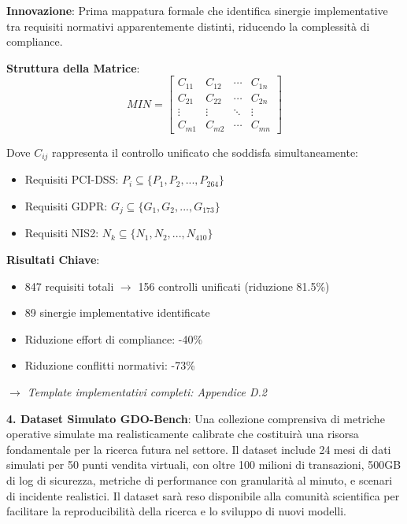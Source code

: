 \begin{tcolorbox}[
    colback=orange!5!white,
    colframe=orange!75!black,
    title={\textbf{Innovation Box 1.3:} Matrice di Integrazione Normativa (MIN)},
    fonttitle=\bfseries,
    boxrule=1.5pt,
    arc=2mm,
    breakable
]
\textbf{Innovazione}: Prima mappatura formale che identifica sinergie implementative tra requisiti normativi apparentemente distinti, riducendo la complessità di compliance.

\vspace{0.3cm}
\textbf{Struttura della Matrice}:
\begin{equation*}
MIN = \begin{bmatrix}
C_{11} & C_{12} & \cdots & C_{1n} \\
C_{21} & C_{22} & \cdots & C_{2n} \\
\vdots & \vdots & \ddots & \vdots \\
C_{m1} & C_{m2} & \cdots & C_{mn}
\end{bmatrix}
\end{equation*}

Dove $C_{ij}$ rappresenta il controllo unificato che soddisfa simultaneamente:
\begin{itemize}
    \item Requisiti PCI-DSS: $P_i \subseteq \{P_1, P_2, ..., P_{264}\}$
    \item Requisiti GDPR: $G_j \subseteq \{G_1, G_2, ..., G_{173}\}$
    \item Requisiti NIS2: $N_k \subseteq \{N_1, N_2, ..., N_{410}\}$
\end{itemize}

\vspace{0.3cm}
\textbf{Risultati Chiave}:
\begin{itemize}
    \item 847 requisiti totali $\rightarrow$ 156 controlli unificati (riduzione 81.5\%)
    \item 89 sinergie implementative identificate
    \item Riduzione effort di compliance: -40\%
    \item Riduzione conflitti normativi: -73\%
\end{itemize}

\vspace{0.2cm}
\textit{$\rightarrow$ Template implementativi completi: Appendice D.2}
\end{tcolorbox}

\textbf{4. Dataset Simulato GDO-Bench}: Una collezione comprensiva di metriche operative simulate ma realisticamente calibrate che costituirà una risorsa fondamentale per la ricerca futura nel settore. Il dataset include 24 mesi di dati simulati per 50 punti vendita virtuali, con oltre 100 milioni di transazioni, 500GB di log di sicurezza, metriche di performance con granularità al minuto, e scenari di incidente realistici. Il dataset sarà reso disponibile alla comunità scientifica per facilitare la reproducibilità della ricerca e lo sviluppo di nuovi modelli.

